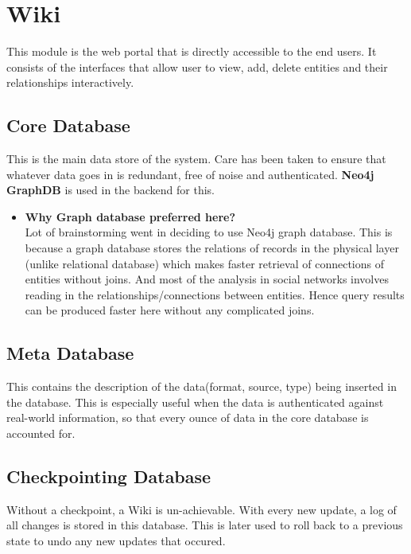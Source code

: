\section{Wiki}
This module is the web portal that is directly accessible to the end users. It consists of the interfaces that allow user to view, add, delete entities and their relationships interactively. 

\subsection{\textbf{Core Database}}
This is the main data store of the system. Care has been taken to ensure that whatever data goes in is redundant, free of noise and authenticated. \textbf{Neo4j GraphDB} \cite{Neo4j} is used in the backend for this. 

\begin{itemize}
\item\textbf{Why Graph database preferred here?}\\
Lot of brainstorming went in deciding to use Neo4j graph database. This is because a graph database stores the relations of records in the physical layer (unlike relational database) which makes faster retrieval of connections of entities without joins. And most of the analysis in social networks involves reading in the relationships/connections between entities. Hence query results can be produced faster here without any complicated joins.
\end{itemize}

\subsection{\textbf{Meta Database}} 
This contains the description of the data(format, source, type) being inserted in the database. This is especially useful when the data is authenticated against real-world information, so that every ounce of data in the core database is accounted for.
\subsection{\textbf{Checkpointing Database}}
Without a checkpoint, a Wiki is un-achievable. With every new update, a log of all changes is stored in this database. This is later used to roll back to a previous state to undo any new updates that occured. 
